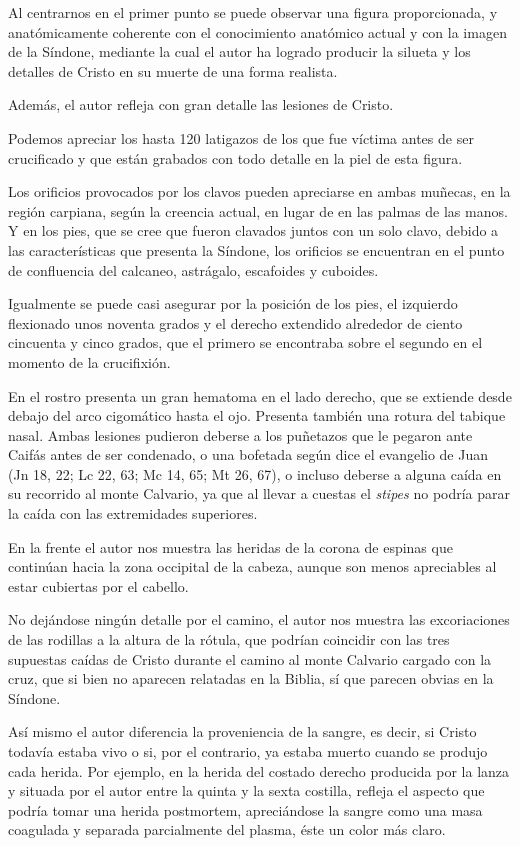 Al centrarnos en el primer punto se puede observar una figura proporcionada, y anatómicamente coherente con el conocimiento anatómico actual y con la imagen de la Síndone, mediante la cual el autor ha logrado producir la silueta y los detalles de Cristo en su muerte de una forma realista.

Además, el autor refleja con gran detalle las lesiones de Cristo.

Podemos apreciar los hasta 120 latigazos de los que fue víctima antes de ser crucificado y que están grabados con todo detalle en la piel de esta figura.

Los orificios provocados por los clavos pueden apreciarse en ambas muñecas, en la región carpiana, según la creencia actual, en lugar de en las palmas de las manos. Y en los pies, que se cree que fueron clavados juntos con un solo clavo, debido a las características que presenta la Síndone, los orificios se encuentran en el punto de confluencia del calcaneo, astrágalo, escafoides y cuboides.

Igualmente se puede casi asegurar por la posición de los pies, el izquierdo flexionado unos noventa grados y el derecho extendido alrededor de ciento cincuenta y cinco grados, que el primero se encontraba sobre el segundo en el momento de la crucifixión.

En el rostro presenta un gran hematoma en el lado derecho, que se extiende desde debajo del arco cigomático hasta el ojo. Presenta también una rotura del tabique nasal. Ambas lesiones pudieron deberse a los puñetazos que le pegaron ante Caifás antes de ser condenado, o una bofetada según dice el evangelio de Juan (Jn 18, 22; Lc 22, 63; Mc 14, 65; Mt 26, 67), o incluso deberse a alguna caída en su recorrido al monte Calvario, ya que al llevar a cuestas el \textit{stipes} no podría parar la caída con las extremidades superiores.

En la frente el autor nos muestra las heridas de la corona de espinas que continúan hacia la zona occipital de la cabeza, aunque son menos apreciables al estar cubiertas por el cabello.

No dejándose ningún detalle por el camino, el autor nos muestra las excoriaciones de las rodillas a la altura de la rótula, que podrían coincidir con las tres supuestas caídas de Cristo durante el camino al monte Calvario cargado con la cruz, que si bien no aparecen relatadas en la Biblia, sí que parecen obvias en la Síndone.

Así mismo el autor diferencia la proveniencia de la sangre, es decir, si Cristo todavía estaba vivo o si, por el contrario, ya estaba muerto cuando se produjo cada herida. Por ejemplo, en la herida del costado derecho producida por la lanza y situada por el autor entre la quinta y la sexta costilla, refleja el aspecto que podría tomar una herida postmortem, apreciándose la sangre como una masa coagulada y separada parcialmente del plasma, éste un color más claro.

